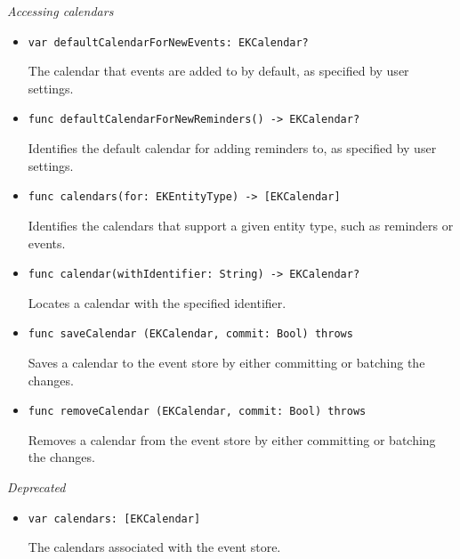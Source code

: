 \documentclass{article}
\begin{document}
\textit{Accessing calendars}
\begin{itemize}
    \item \texttt{var defaultCalendarForNewEvents: EKCalendar?}

    The calendar that events are added to by default, as specified by user settings.
    \item \texttt{func defaultCalendarForNewReminders() -> EKCalendar?}

    Identifies the default calendar for adding reminders to, as specified by user settings.
    \item \texttt{func calendars(for: EKEntityType) -> [EKCalendar]}

    Identifies the calendars that support a given entity type, such as reminders or events.
    \item \texttt{func calendar(withIdentifier: String) -> EKCalendar?}

    Locates a calendar with the specified identifier.
    \item \texttt{func saveCalendar (EKCalendar, commit: Bool) throws}

    Saves a calendar to the event store by either committing or batching the changes.
    \item \texttt{func removeCalendar (EKCalendar, commit: Bool) throws}

    Removes a calendar from the event store by either committing or batching the changes.
\end{itemize}

\textit{Deprecated}
\begin{itemize}
    \item \texttt{var calendars: [EKCalendar]}

    The calendars associated with the event store.
\end{itemize}
\end{document}
